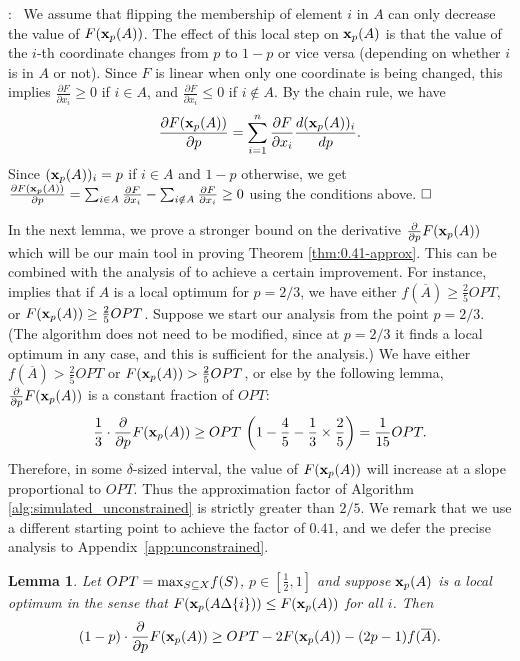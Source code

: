 \documentclass{article}[11pt]
\newtheorem{lemma}[theorem]{Lemma}
\newcommand{\partdiff}[2]{\frac{\partial {#1}}{\partial {#2}}}
\renewenvironment{proof}{\noindent{\bf Proof}:~}{$\hfill \Box$\\}
\def\bx{{\bf x}}
\def\max{{\rm{max}}}
\begin{document}
\begin{proof}
We assume that flipping the membership of element $i$ in $A$ can only decrease the value
of $F(\bx_p(A))$. The effect of this local step on $\bx_p(A)$ is that the value of the $i$-th coordinate
changes from $p$ to $1-p$ or vice versa (depending on whether $i$ is in $A$ or not).
Since $F$ is linear when only one coordinate is being changed, this implies
$\partdiff{F}{x_i} \geq 0$ if $i \in A$, and $\partdiff{F}{x_i} \leq 0$ if $i \notin A$.
By the chain rule, we have
$$ \partdiff{F(\bx_p(A))}{p} = \sum_{i=1}^{n} \partdiff{F}{x_i} \frac{d (\bx_p(A))_i}{dp}.$$
Since $(\bx_p(A))_i = p$ if $i \in A$ and $1-p$ otherwise, we get
$ \partdiff{F(\bx_p(A))}{p} = \sum_{i \in A} \partdiff{F}{x_i} -
 \sum_{i \notin A} \partdiff{F}{x_i} \geq 0 $
using the conditions above.
\end{proof}

In the next lemma, we prove a stronger bound on the derivative $\partdiff{}{p} F(\bx_p(A))$
which will be our main tool in proving Theorem \ref{thm:0.41-approx}.
This can be combined with the analysis of \cite{FMV07} to achieve a certain improvement.
For instance, \cite{FMV07} implies that if $A$ is a local optimum for $p=2/3$,
we have either $f(\overline{A}) \geq \frac25 OPT$, or $F(\bx_p(A)) \geq \frac25 OPT$. 
Suppose we start our analysis from the point $p = 2/3$. (The algorithm does not need
to be modified, since at $p=2/3$ it finds a local optimum in any case, and this is
sufficient for the analysis.)
We have either $f(\overline{A})>\frac25 OPT$ or $F(\bx_p(A))>\frac25 OPT$,
or else by the following lemma, $\partdiff{}{p} F(\bx_p(A))$ is a constant fraction of $OPT$:
$$ \frac{1}{3} \cdot \partdiff{}{p} F(\bx_p(A)) \geq OPT \, \left(1-\frac{4}{5}
 - \frac{1}{3}\times\frac{2}{5}\right) = \frac{1}{15}OPT.$$
Therefore, in some $\delta$-sized interval, the value of $F(\bx_p(A))$
will increase at a slope proportional to $OPT$. Thus the approximation factor of
 Algorithm \ref{alg:simulated_unconstrained} is strictly greater than $2/5$.
We remark that we use a different starting point to achieve the factor of $0.41$,
and we defer the precise analysis to Appendix~\ref{app:unconstrained}.



\begin{lemma}
\label{lem:drift-bound}
Let $OPT=\max_{S \subseteq X} f(S)$, $p \in [\frac12,1]$ and suppose $\bx_p(A)$ is
a local optimum in the sense that 
$F(\bx_p(A \Delta \{i\})) \leq F(\bx_p(A))$ for all $i$. Then
$$ (1-p) \cdot \partdiff{}{p} F(\bx_p(A)) \geq OPT - 2 F(\bx_p(A)) - (2p-1) f(\overline{A}).$$
\end{lemma}
\end{document}

